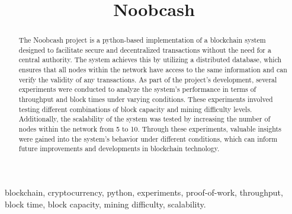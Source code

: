 \documentclass[conference]{IEEEtran}
\begin{document}
\title{Noobcash\\
}

\author{
\and
{}
\and
{}
}

\maketitle

\begin{abstract}
The Noobcash project is a python-based \cite{b2} implementation of a blockchain system designed to facilitate secure and decentralized transactions without the need for a central authority. The system achieves this by utilizing a distributed database, which ensures that all nodes within the network have access to the same information and can verify the validity of any transactions. As part of the project's development, several experiments were conducted to analyze the system's performance in terms of throughput and block times under varying conditions. These experiments involved testing different combinations of block capacity and mining difficulty levels. Additionally, the scalability of the system was tested by increasing the number of nodes within the network from 5 to 10. Through these experiments, valuable insights were gained into the system's behavior under different conditions, which can inform future improvements and developments in blockchain technology.
\end{abstract}

\begin{IEEEkeywords}
blockchain, cryptocurrency, python, experiments, proof-of-work, throughput, block time, block capacity, mining difficulty, scalability.
\end{IEEEkeywords}
\end{document}
